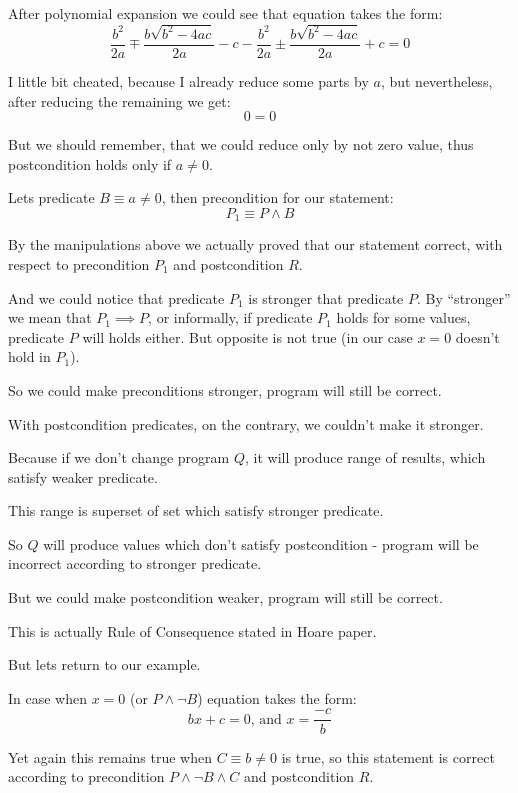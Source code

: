 \documentclass[twoside,twocolumn]{article}
\begin{document}
After polynomial expansion we could see that equation takes the form:
$$\frac{b^2}{2a} \mp \frac{b\sqrt{b^2 - 4ac}}{2a} - c - \frac{b^2}{2a} \pm
\frac{b\sqrt{b^2 - 4ac}}{2a} + c = 0$$

I little bit cheated, because I already reduce some parts by $a$, but
nevertheless, after reducing the remaining we get:
$$ 0 = 0 $$

But we should remember, that we could reduce only by not zero value, thus
postcondition holds only if $a \neq 0$.

Lets predicate $B \equiv a \neq 0$, then precondition for our statement:
$$ P_1 \equiv P \wedge B $$

By the manipulations above we actually proved that our statement correct, with
respect to precondition $P_1$ and postcondition $R$.

And we could notice that predicate $P_1$ is stronger that predicate $P$. By
``stronger'' we mean that $P_1 \implies P$, or informally, if predicate $P_1$
holds for some values, predicate $P$ will holds either. But opposite is not true
(in our case $x = 0$ doesn't hold in $P_1$).

So we could make preconditions stronger, program will still be correct.

With postcondition predicates, on the contrary, we couldn't make it
stronger.

Because if we don't change program $Q$, it will produce range of
results, which satisfy weaker predicate.

This range is superset of set which satisfy stronger predicate.

So $Q$ will produce values which don't satisfy postcondition - program will be
incorrect according to stronger predicate.

But we could make postcondition weaker, program will still be correct.

This is actually Rule of Consequence stated in Hoare paper.

But lets return to our example.


In case when $x = 0$ (or $P \wedge \neg B$) equation takes the form:
$$ bx + c = 0 \text{, and } x = \frac{-c}{b}$$

Yet again this remains true when $C \equiv b \neq 0$ is true, so this statement
is correct according to precondition $P \wedge \neg B \wedge C$ and
postcondition $R$.
\end{document}
